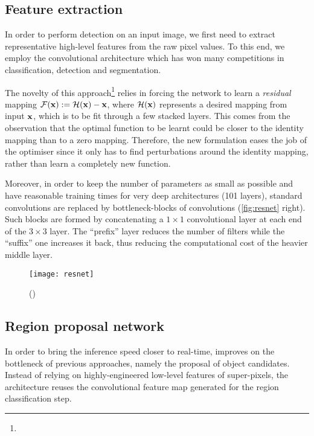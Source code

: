 
	\subsection{Feature extraction}\label{sec:resnet}
		In order to perform detection on an input image, we first need to extract representative high-level features from the raw pixel values. To this end, we employ the \RESNET{} convolutional architecture which has won many competitions in classification, detection and segmentation.

		The novelty of this approach\footnote{} relies in forcing the network to learn a \emph{residual} mapping \(\mathcal{F}(\mathbf{x}) := \mathcal{H}(\mathbf{x}) - \mathbf{x}\), where \(\mathcal{H}(\mathbf{x})\) represents a desired mapping from input \(\mathbf{x}\), which is to be fit through a few stacked layers. This comes from the observation that the optimal function to be learnt could be closer to the identity mapping than to a zero mapping. Therefore, the new formulation eases the job of the optimiser since it only has to find perturbations around the identity mapping, rather than learn a completely new function.

		Moreover, in order to keep the number of parameters as small as possible and have reasonable training times for very deep architectures (101 layers), standard convolutions are replaced by bottleneck-blocks of convolutions (\autoref{fig:resnet} right). Such blocks are formed by concatenating a \(1 \times 1\) convolutional layer at each end of the \(3 \times 3\) layer. The ``prefix'' layer reduces the number of filters while the ``suffix'' one increases it back, thus reducing the computational cost of the heavier middle layer.

		\begin{figure}
			\centering
			\texttt{[image: resnet]}
			\caption[ResNet blocks]{
				(\citet{resnet})
				\label{fig:resnet}
			}
		\end{figure}



	\subsection{Region proposal network}\label{sec:frcnn_rpn}
		In order to bring the inference speed closer to real-time, \FRCNN{} improves on the bottleneck of previous approaches, namely the proposal of object candidates. Instead of relying on highly-engineered low-level features of super-pixels, the architecture reuses the convolutional feature map generated for the region classification step.

